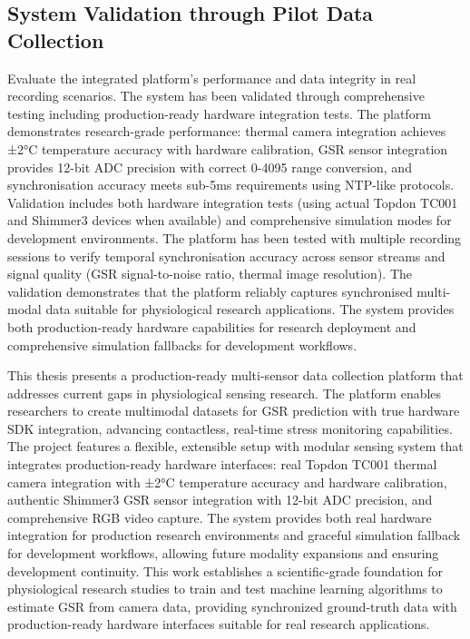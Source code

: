 \subsection{System Validation through Pilot Data Collection} Evaluate the integrated platform's performance and data integrity in real recording scenarios. The system has been validated through comprehensive testing including production-ready hardware integration tests. The platform demonstrates research-grade performance: thermal camera integration achieves ±2°C temperature accuracy with hardware calibration, GSR sensor integration provides 12-bit ADC precision with correct 0-4095 range conversion, and synchronisation accuracy meets sub-5ms requirements using NTP-like protocols. Validation includes both hardware integration tests (using actual Topdon TC001 and Shimmer3 devices when available) and comprehensive simulation modes for development environments. The platform has been tested with multiple recording sessions to verify temporal synchronisation accuracy across sensor streams and signal quality (GSR signal-to-noise ratio, thermal image resolution). The validation demonstrates that the platform reliably captures synchronised multi-modal data suitable for physiological research applications. The system provides both production-ready hardware capabilities for research deployment and comprehensive simulation fallbacks for development workflows.


This thesis presents a production-ready multi-sensor data collection platform that addresses current gaps in physiological sensing research. The platform enables researchers to create multimodal datasets for GSR prediction with true hardware SDK integration, advancing contactless, real-time stress monitoring capabilities. The project features a flexible, extensible setup with modular sensing system that integrates production-ready hardware interfaces: real Topdon TC001 thermal camera integration with ±2°C temperature accuracy and hardware calibration, authentic Shimmer3 GSR sensor integration with 12-bit ADC precision, and comprehensive RGB video capture. The system provides both real hardware integration for production research environments and graceful simulation fallback for development workflows, allowing future modality expansions and ensuring development continuity. This work establishes a scientific-grade foundation for physiological research studies to train and test machine learning algorithms to estimate GSR from camera data, providing synchronized ground-truth data with production-ready hardware interfaces suitable for real research applications.


